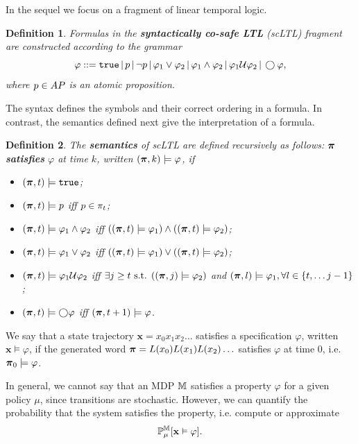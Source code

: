\documentclass[conference]{IEEEtran}
\newtheorem{definition}{Definition}
\begin{document}
In the sequel we focus on a fragment of linear temporal logic.
\begin{definition}
  \label{def:gdtl-syntax}
  Formulas in the \textbf{syntactically co-safe LTL} (scLTL) fragment are constructed according to the grammar
  \begin{equation}
    \label{eq:scLTL}
    \varphi ::=  \True \, |\,p \, |\, \lnot p \, |\, \varphi_1 \vee\varphi_2  \, |\, \varphi_1 \land \varphi_2 \, |\, \varphi_1 \ltluntil \varphi_2 \, |\, \ltlnext \varphi,
  \end{equation}
  where $p\in AP$ is an atomic proposition.
\end{definition}
The syntax defines the symbols and their correct ordering in a formula. In contrast, the semantics defined next give the interpretation of a formula.
\begin{definition}
 The \textbf{semantics} of scLTL are defined recursively as follows: $\boldsymbol{\pi}$ \textbf{satisfies} $\varphi$ at time $k$, written $(\boldsymbol{\pi}, k) \models \varphi$, if
 \begin{itemize}
    \item $(\boldsymbol{\pi}, t) \models \texttt{true}$;
    \item $(\boldsymbol{\pi}, t) \models p$ iff $p \in \pi_t$;
    \item $(\boldsymbol{\pi}, t) \models \varphi_1 \land  \varphi_2  $ iff $ ( (\boldsymbol{\pi}, t) \models \varphi_1 ) \land ( (\boldsymbol{\pi}, t) \models \varphi_2 ) $;
    \item $(\boldsymbol{\pi}, t) \models \varphi_1 \lor  \varphi_2  $ iff $ ( (\boldsymbol{\pi}, t) \models \varphi_1 ) \lor ( (\boldsymbol{\pi}, t) \models \varphi_2 ) $;
    \item $(\boldsymbol{\pi}, t) \models  \varphi_1 \mathcal{U} \varphi_2 $ iff $\exists j \geq t \text{ s.t. } ((\boldsymbol{\pi}, j) \models \varphi_2 ) $ and $(\boldsymbol{\pi}, l) \models \varphi_1, \forall l \in \{t, \ldots j-1\}$;
    \item $(\boldsymbol{\pi}, t) \models \bigcirc \varphi$ iff $(\boldsymbol{\pi}, t+1) \models \varphi$.
 \end{itemize}

\end{definition}
We say that a state trajectory $\mathbf{x} = x_0 x_1 x_2 \ldots$ satisfies a specification $\varphi$, written $\mathbf{x} \models \varphi$, if the generated word $\boldsymbol{\pi} =L(x_0) L(x_1) L(x_2) \ldots$ satisfies $\varphi$ at time 0, i.e. $\boldsymbol{\pi}_0 \models \varphi$.

In general, we cannot say that an MDP $\mathbb{M}$ satisfies a property $\varphi$ for a given policy $\mu$, since transitions are stochastic. However, we can quantify the probability that the system satisfies the property, i.e. compute or approximate
\begin{equation}
  \label{eq:probLTL}
  \mathbb P_{\mu}^\MDP[\mathbf x \vDash \varphi ].
\end{equation}
\end{document}
